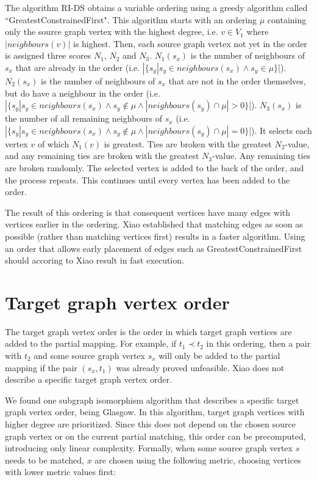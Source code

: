 The algorithm RI-DS obtains a variable ordering using a greedy algorithm called ``GreatestConstrainedFirst". This algorithm starts with an ordering $\mu$ containing only the source graph vertex with the highest degree, i.e. $v\in V_1$ where $|\mathit{neighbours}(v)|$ is highest. Then, each source graph vertex not yet in the order is assigned three scores $N_1$, $N_2$ and $N_3$. $N_1(s_x)$ is the number of neighbours of $s_x$ that are already in the order (i.e. $|\{s_y | s_y \in \mathit{neighbours}(s_x) \land s_y \in \mu\}$|). $N_2(s_x)$ is the number of neighbours of $s_x$ that are not in the order themselves, but do have a neighbour in the order (i.e. $|\{s_y | s_y \in \mathit{neighbours}(s_x) \land s_y \not \in \mu \land |\mathit{neighbours}(s_y) \cap \mu| > 0\}$|). $N_3(s_x)$ is the number of all remaining neighbours of $s_x$ (i.e. $|\{s_y | s_y \in \mathit{neighbours}(s_x) \land s_y \not \in \mu \land |\mathit{neighbours}(s_y) \cap \mu| = 0\}$|). It selects each vertex $v$ of which $N_1(v)$ is greatest. Ties are broken with the greatest $N_2$-value, and any remaining ties are broken with the greatest $N_3$-value. Any remaining ties are broken randomly. The selected vertex is added to the back of the order, and the process repeats. This continues until every vertex has been added to the order.

The result of this ordering is that consequent vertices have many edges with vertices earlier in the ordering. Xiao established that matching edges as soon as possible (rather than matching vertices first) results in a faster algorithm. Using an order that allows early placement of edges such as GreatestConstrainedFirst should accoring to Xiao result in fast execution.
\section{Target graph vertex order}
\label{sec:targetOrder}

The target graph vertex order is the order in which target graph vertices are added to the partial mapping. For example, if $t_1 \prec t_2$ in this ordering, then a pair with $t_2$ and some source graph vertex $s_x$ will only be added to the partial mapping if the pair $(s_x, t_1)$ was already proved unfeasible. Xiao does not describe a specific target graph vertex order.

We found one subgraph isomorphism algorithm that describes a specific target graph vertex order, being Glasgow\cite{McCreesh2015}. In this algorithm, target graph vertices with higher degree are prioritized. Since this does not depend on the chosen source graph vertex or on the current partial matching, this order can be precomputed, introducing only linear complexity. Formally, when some source graph vertex $s$ needs to be matched, $x$ are chosen using the following metric, choosing vertices with lower metric values first:

